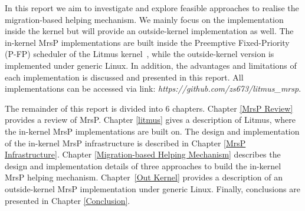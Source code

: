 \documentclass{report}
\begin{document}
In this report we aim to investigate and explore feasible approaches to realise the migration-based helping mechanism. We mainly focus on the implementation inside the kernel but will provide an outside-kernel implementation as well. The in-kernel MrsP implementations are built inside the Preemptive Fixed-Priority (P-FP) scheduler of the Litmus kernel~\cite{calandrino2006litmus, brandenburg2011scheduling}, while the outside-kernel version is implemented under generic Linux. In addition, the advantages and limitations of each implementation is discussed and presented in this report. All implementations can be accessed via link: \emph{https://github.com/zs673/litmus\_mrsp}.

The remainder of this report is divided into 6 chapters. Chapter \ref{MrsP Review} provides a review of MrsP. Chapter \ref{litmus} gives a description of Litmus, where the in-kernel MrsP implementations are built on. The design and implementation of the in-kernel MrsP infrastructure is described in Chapter \ref{MrsP Infrastructure}. Chapter \ref{Migration-based Helping Mechanism} describes the design and implementation details of three approaches to build the in-kernel MrsP helping mechanism. Chapter~\ref{Out Kernel} provides a description of an outside-kernel MrsP implementation under generic Linux. Finally, conclusions are presented in Chapter \ref{Conclusion}.
\end{document}

